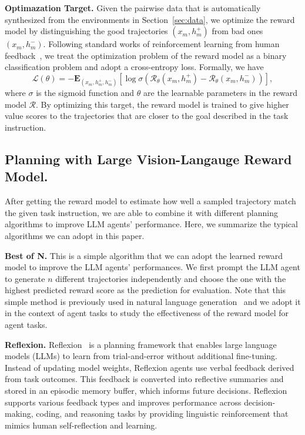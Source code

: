 \noindent\textbf{Optimazation Target.}
Given the pairwise data that is automatically synthesized from the environments in Section~\ref{sec:data}, we optimize the reward model by distinguishing the good trajectories $(x_m, h^+_m)$ from bad ones $(x_m, h^-_m)$. Following standard works of reinforcement learning from human feedback~\citep{bradley1952rank,sun2023salmon,sun2023aligning}, we treat the optimization problem of the reward model as a binary classification problem and adopt a cross-entropy loss. Formally, we have 
\begin{equation}
    \mathcal{L(\theta)} = -\mathbf{E}_{(x_m,h_m^+,h_m^-)}[\log\sigma(\mathcal{R}_\theta(x_m, h_m^+)-\mathcal{R}_\theta(x_m, h_m^-))],
\end{equation}
where $\sigma$ is the sigmoid function and $\theta$ are the learnable parameters in the reward model $\mathcal{R}$.
By optimizing this target, the reward model is trained to give higher value scores to the trajectories that are closer to the goal described in the task instruction. 

\subsection{ Planning with Large Vision-Langauge Reward Model.}
After getting the reward model to estimate how well a sampled trajectory match the given task instruction, we are able to combine it with different planning algorithms to improve LLM agents' performance. Here, we summarize the typical algorithms we can adopt in this paper.

\noindent\textbf{Best of N.} This is a simple algorithm that we can adopt the learned reward model to improve the LLM agents' performances. We first prompt the LLM agent to generate $n$ different trajectories independently and choose the one with the highest predicted reward score as the prediction for evaluation. Note that this simple method is previously used in natural language generation~\citep{zhang2024improving} and we adopt it in the context of agent tasks to study the effectiveness of the reward model for agent tasks.

\noindent\textbf{Reflexion.} Reflexion~\citep{shinn2024reflexion} is a planning framework that enables large language models (LLMs) to learn from trial-and-error without additional fine-tuning. Instead of updating model weights, Reflexion agents use verbal feedback derived from task outcomes. This feedback is converted into reflective summaries and stored in an episodic memory buffer, which informs future decisions. Reflexion supports various feedback types and improves performance across decision-making, coding, and reasoning tasks by providing linguistic reinforcement that mimics human self-reflection and learning. %

